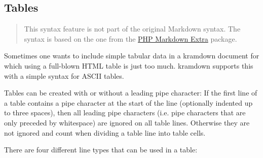 \documentclass[a4paper]{article}
\begin{document}
\hypertarget{tables}{\subsection{Tables}\label{tables}}

\begin{quote}
This syntax feature is not part of the original Markdown syntax. The
syntax is based on the one from the
\href{http://michelf.com/projects/php-markdown/extra/}{PHP Markdown
Extra} package.
\end{quote}

Sometimes one wants to include simple tabular data in a kramdown
document for which using a full-blown HTML table is just too much.
kramdown supports this with a simple syntax for ASCII tables.

Tables can be created with or without a leading pipe character: If the
first line of a table contains a pipe character at the start of the line
(optionally indented up to three spaces), then all leading pipe
characters (i.e. pipe characters that are only preceded by whitespace)
are ignored on all table lines. Otherwise they are not ignored and count
when dividing a table line into table cells.

There are four different line types that can be used in a table:
\end{document}
